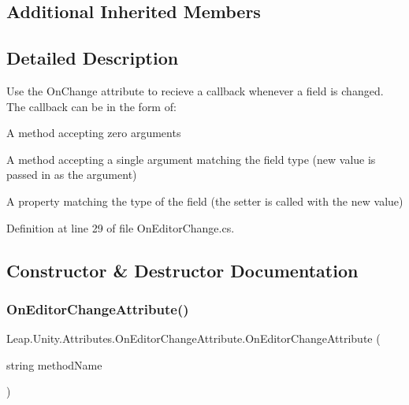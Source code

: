 \subsection*{Additional Inherited Members}


\subsection{Detailed Description}
Use the On\+Change attribute to recieve a callback whenever a field is changed. The callback can be in the form of\+: 


\begin{DoxyItemize}
\item A method accepting zero arguments
\item A method accepting a single argument matching the field type (new value is passed in as the argument)
\item A property matching the type of the field (the setter is called with the new value) 
\end{DoxyItemize}

Definition at line 29 of file On\+Editor\+Change.\+cs.



\subsection{Constructor \& Destructor Documentation}
\mbox{\label{class_leap_1_1_unity_1_1_attributes_1_1_on_editor_change_attribute_aa3132c576e55b39c001c0bd97cf6dd9b}} 
\subsubsection{\texorpdfstring{OnEditorChangeAttribute()}{OnEditorChangeAttribute()}}
{\footnotesize\ttfamily Leap.\+Unity.\+Attributes.\+On\+Editor\+Change\+Attribute.\+On\+Editor\+Change\+Attribute (\begin{DoxyParamCaption}\item[{string}]{method\+Name }\end{DoxyParamCaption})}



